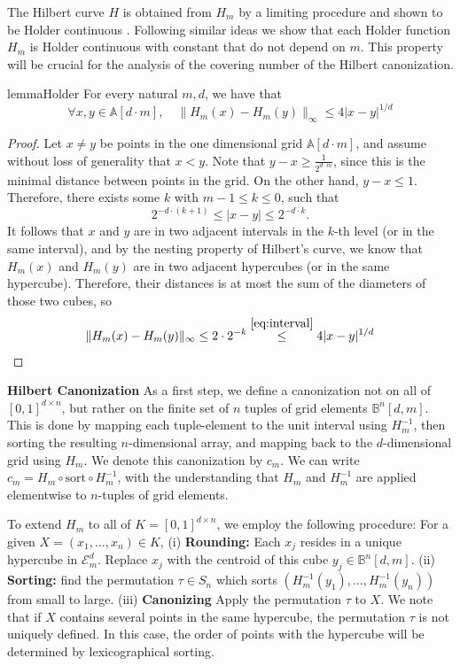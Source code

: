 \documentclass{article}
\theoremstyle{definition}
\theoremstyle{plain}
\begin{document}
The Hilbert curve $H$ is obtained from $H_m$ by a limiting procedure and shown to be Holder continuous \cite{Hilbert}. Following similar ideas we show that each Holder function $H_m$ is Holder continuous with constant that do not depend on $m$. This property will be crucial for the analysis of the covering number of the Hilbert canonization.
\begin{restatable}{lemma}{Holder}\label{lem:Holder}
For every natural $m,d$, we have that 
$$\forall x,y\in \mathbb{A}[d\cdot m], \quad  \|H_m(x)-H_m(y)\|_\infty \leq 4|x-y|^{1/d} $$
\end{restatable}
\begin{proof}
    Let $x\neq y$ be points in the one dimensional grid $\mathbb{A}[d\cdot m]$, and assume without loss of generality that $x<y$. Note that $y-x\geq \frac{1}{2^{d\cdot m}}$, since this is the minimal distance between points in the grid. On the other hand, $y-x\leq 1$. Therefore, there exists some $k$ with $m-1\leq k \leq 0 $, such that 
    \begin{equation}\label{eq:interval} 
    2^{-d\cdot (k+1)}\leq |x-y|\leq 2^{-d \cdot k}.
    \end{equation}
   It follows that $x$ and $y$ are in two adjacent intervals in the $k$-th level (or in the same interval), and by the nesting property of Hilbert's curve, we know that $H_m(x)$ and $H_m(y)$ are in two adjacent hypercubes (or in the same hypercube). Therefore, their distances is at most the sum of the diameters of those two cubes, so
    \begin{align*}
    \|H_m(x)-H_m(y)\|_\infty\leq 2\cdot 2^{-k}\stackrel{\eqref{eq:interval}}{\leq} 4|x-y|^{1/d}
    \end{align*}
\end{proof}



\textbf{Hilbert Canonization}
As a first step, we define a canonization not on all of $[0,1]^{d\times n}$, but rather on the finite set of $n$ tuples of grid elements $\mathbb{B}^n[d,m] $. This is done by mapping each tuple-element to the unit interval using $H_m^{-1} $, then sorting the resulting $n$-dimensional array, and mapping back to the $d$-dimensional grid using $H_m$. We denote this canonization by $c_m$. We can write $c_m=H_m \circ \mathrm{sort}\circ H_m^{-1}$, with the understanding that $H_m$ and  $H_m^{-1} $ are applied elementwise to $n$-tuples of grid elements. 

To extend $H_m$ to all of $K=[0,1]^{d\times n}$, we employ the following procedure: For a given $X=(x_1,\ldots,x_n)\in K  $, (i) \textbf{Rounding:} Each $x_j$ resides in a unique hypercube in $ \mathcal{E}_m^d$. Replace $x_j$ with the centroid of this cube $y_j\in \mathbb{B}^n[d,m] $. (ii) \textbf{Sorting:} find the permutation $\tau \in S_n$ which sorts $\left(H_m^{-1}(y_1),\ldots,H_m^{-1}(y_n) \right)$ from small to large. (iii) \textbf{Canonizing} Apply the permutation $\tau$ to $X$. We note that if $X$ contains several points in the same hypercube, the permutation $\tau$ is not uniquely defined. In this case, the order of points with the hypercube will be determined by lexicographical sorting. 
\end{document}
